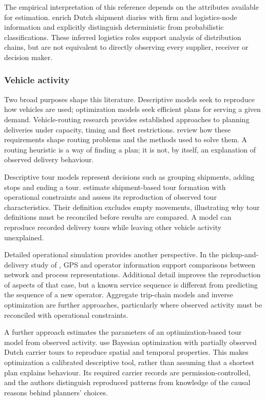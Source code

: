 The empirical interpretation of this reference depends on the attributes
available for estimation. \Textcite{mohammed2023} enrich Dutch shipment diaries
with firm and logistics-node information and explicitly distinguish deterministic
from probabilistic classifications. These inferred logistics roles support
analysis of distribution chains, but are not equivalent to directly observing
every supplier, receiver or decision maker.

\subsubsection{Vehicle activity}\label{sec:f5}
Two broad purposes shape this literature. Descriptive models seek to reproduce
how vehicles are used; optimization models seek efficient plans for serving a
given demand. Vehicle-routing research provides established approaches to
planning deliveries under capacity, timing and fleet restrictions.
\Textcite{vidal2013} review how these requirements shape routing problems and
the methods used to solve them. A routing heuristic is a way of finding a plan;
it is not, by itself, an explanation of observed delivery behaviour.

Descriptive tour models represent decisions such as grouping shipments, adding
stops and ending a tour. \Textcite{thoen2020} estimate shipment-based tour
formation with operational constraints and assess its reproduction of observed
tour characteristics. Their definition excludes empty movements, illustrating
why tour definitions must be reconciled before results are compared. A model
can reproduce recorded delivery tours while leaving other vehicle activity
unexplained.

Detailed operational simulation provides another perspective. In the
pickup-and-delivery study of \textcite{lyu2021}, GPS and operator information
support comparisons between network and process representations. Additional
detail improves the reproduction of aspects of that case, but a known service
sequence is different from predicting the sequence of a new operator. Aggregate
trip-chain models and inverse optimization are further approaches, particularly
where observed activity must be reconciled with operational constraints.

A further approach estimates the parameters of an optimization-based tour model
from observed activity. \Textcite{nadi2024} use Bayesian optimization with
partially observed Dutch carrier tours to reproduce spatial and temporal
properties. This makes optimization a calibrated descriptive tool, rather than
assuming that a shortest plan explains behaviour. Its required carrier records
are permission-controlled, and the authors distinguish reproduced patterns from
knowledge of the causal reasons behind planners' choices.

